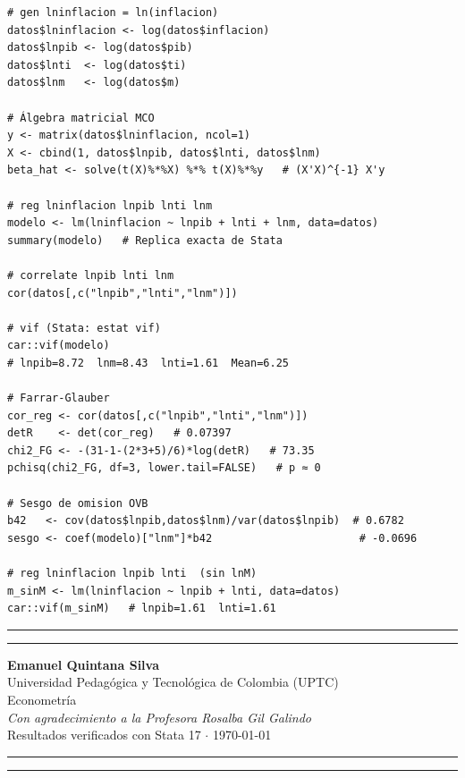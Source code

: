 \documentclass[12pt,a4paper]{article}
\begin{document}
\begin{lstlisting}[style=Rcode,caption={Fragmento clave del script R (réplica de Stata)}]
# gen lninflacion = ln(inflacion)
datos$lninflacion <- log(datos$inflacion)
datos$lnpib <- log(datos$pib)
datos$lnti  <- log(datos$ti)
datos$lnm   <- log(datos$m)

# Álgebra matricial MCO
y <- matrix(datos$lninflacion, ncol=1)
X <- cbind(1, datos$lnpib, datos$lnti, datos$lnm)
beta_hat <- solve(t(X)%*%X) %*% t(X)%*%y   # (X'X)^{-1} X'y

# reg lninflacion lnpib lnti lnm
modelo <- lm(lninflacion ~ lnpib + lnti + lnm, data=datos)
summary(modelo)   # Replica exacta de Stata

# correlate lnpib lnti lnm
cor(datos[,c("lnpib","lnti","lnm")])

# vif (Stata: estat vif)
car::vif(modelo)
# lnpib=8.72  lnm=8.43  lnti=1.61  Mean=6.25

# Farrar-Glauber
cor_reg <- cor(datos[,c("lnpib","lnti","lnm")])
detR    <- det(cor_reg)   # 0.07397
chi2_FG <- -(31-1-(2*3+5)/6)*log(detR)   # 73.35
pchisq(chi2_FG, df=3, lower.tail=FALSE)   # p ≈ 0

# Sesgo de omision OVB
b42   <- cov(datos$lnpib,datos$lnm)/var(datos$lnpib)  # 0.6782
sesgo <- coef(modelo)["lnm"]*b42                       # -0.0696

# reg lninflacion lnpib lnti  (sin lnM)
m_sinM <- lm(lninflacion ~ lnpib + lnti, data=datos)
car::vif(m_sinM)   # lnpib=1.61  lnti=1.61
\end{lstlisting}

\vspace{2cm}
\begin{center}
{\color{uptv}\rule{\linewidth}{2pt}}\vspace{2pt}
{\color{oro}\rule{\linewidth}{1.5pt}}
\vspace{4mm}

{\large\bfseries\color{uptv}Emanuel Quintana Silva}\\[4pt]
{\color{gris_t}Universidad Pedagógica y Tecnológica de Colombia (UPTC)}\\[3pt]
{\color{gris_t}Econometría}\\[6pt]
{\large\itshape\color{oro}Con agradecimiento a la Profesora Rosalba Gil Galindo}\\[4pt]
{\scriptsize\color{gris_t}Resultados verificados con Stata 17 $\cdot$ \today}

\vspace{4mm}
{\color{oro}\rule{\linewidth}{1.5pt}}\vspace{2pt}
{\color{uptv}\rule{\linewidth}{2pt}}
\end{center}
\end{document}
